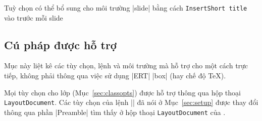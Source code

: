 Tuỳ chọn có thể bổ sung cho môi trường |slide| bằng cách 
\texttt{Insert\LyXarrow Short title} vào trước mỗi slide


\subsection{\texorpdfstring{Cú pháp được hỗ trợ}{Cu phap duoc ho tro}} %

Mục này liệt kê các tùy chọn, lệnh và môi trường mà 
hỗ trợ cho \LyX{} một cách trực tiếp, không phải thông qua việc sử dụng
|ERT| |box| (hay chế độ \TeX).

Mọi tùy chọn cho lớp (Mục~\vref{sec:classopts}) được hỗ trợ thông
qua hộp thoại \texttt{Layout\LyXarrow Document}. Các tùy chọn của lệnh |\pdsetup|
đã nói ở Mục~\vref{sec:setup} được thay đổi thông qua phần |Preamble|
tìm thấy ở hộp thoại \texttt{Layout\LyXarrow Document} của \LyX.

